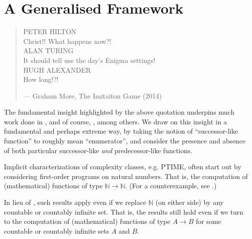 \chapter{A Generalised Framework}

\begin{quotation}

\footnotesize\sffamily\itshape

\begin{flushright}

{\upshape PETER HILTON} \\
Christ!! What happens now?!\\
{\upshape ALAN TURING} \\
It should tell use the day's Enigma settings!\\
{\upshape HUGH ALEXANDER} \\
How long!?!

\smallbreak

\upshape

--- Graham More, The Imitaiton Game (2014)

\end{flushright}

\end{quotation}


The fundamental insight highlighted by the above quotation underpins much work
done in \cite{jones-1999, jones-2001, kristiansen-voda-2005, hofmann-2003,
kristiansen-2008}, and of course, \cite{jones-kristiansen-2009}, among others.
We draw on this insight in a fundamental and perhaps extreme way, by taking the
notion of ``successor-like function'' to roughly mean ``enumerator'', and
consider the presence and absence of both particular successor-like \emph{and}
predecessor-like functions.

Implicit characterizations of complexity classes, e.g. PTIME, often start out
by considering first-order programs on natural numbers. That is, the
computation of (mathematical) functions of type $\mathbb{N} \rightarrow
\mathbb{N}$. (For a counterexample, see \cite{hofmann-2003}.) 

In lieu of , such results apply even if we replace
$\mathbb{N}$ (on either side) by any countable or countably infinite set. That
is, the results still hold even if we turn to the computation of (mathematical)
functions of type $A \rightarrow B$ for some countable or countably infinite
sets $A$ and $B$.

